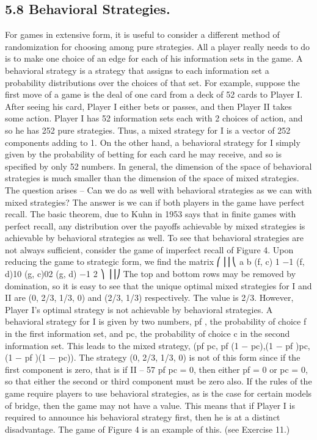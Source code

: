\subsection{5.8 Behavioral Strategies.} For games in extensive form, it is useful to consider a
different method of randomization for choosing among pure strategies. All a player really
needs to do is to make one choice of an edge for each of his information sets in the game.
A behavioral strategy is a strategy that assigns to each information set a probability
distributions over the choices of that set.
For example, suppose the first move of a game is the deal of one card from a deck of
52 cards to Player I. After seeing his card, Player I either bets or passes, and then Player
II takes some action. Player I has 52 information sets each with 2 choices of action, and
so he has 252 pure strategies. Thus, a mixed strategy for I is a vector of 252 components
adding to 1. On the other hand, a behavioral strategy for I simply given by the probability
of betting for each card he may receive, and so is specified by only 52 numbers.
In general, the dimension of the space of behavioral strategies is much smaller than
the dimension of the space of mixed strategies. The question arises – Can we do as well
with behavioral strategies as we can with mixed strategies? The answer is we can if both
players in the game have perfect recall. The basic theorem, due to Kuhn in 1953 says that
in finite games with perfect recall, any distribution over the payoffs achievable by mixed
strategies is achievable by behavioral strategies as well.
To see that behavioral strategies are not always sufficient, consider the game of imperfect
recall of Figure 4. Upon reducing the game to strategic form, we find the matrix
⎛
⎜⎜⎝
a b
(f, c) 1 −1
(f, d)10
(g, c)02
(g, d) −1 2
⎞
⎟⎟⎠
The top and bottom rows may be removed by domination, so it is easy to see that the
unique optimal mixed strategies for I and II are (0, 2/3, 1/3, 0) and (2/3, 1/3) respectively.
The value is 2/3. However, Player I’s optimal strategy is not achievable by behavioral
strategies. A behavioral strategy for I is given by two numbers, pf , the probability of choice
f in the first information set, and pc, the probability of choice c in the second information
set. This leads to the mixed strategy, (pf pc, pf (1 − pc),(1 − pf )pc,(1 − pf )(1 − pc)). The
strategy (0, 2/3, 1/3, 0) is not of this form since if the first component is zero, that is if
II – 57
pf pc = 0, then either pf = 0 or pc = 0, so that either the second or third component must
be zero also.
If the rules of the game require players to use behavioral strategies, as is the case for
certain models of bridge, then the game may not have a value. This means that if Player I
is required to announce his behavioral strategy first, then he is at a distinct disadvantage.
The game of Figure 4 is an example of this. (see Exercise 11.)
